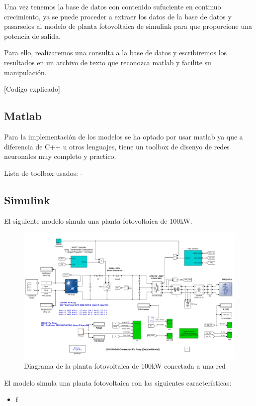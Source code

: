 Una vez tenemos la base de datos con contenido sufuciente en continuo crecimiento, ya se puede proceder a extraer los datos de la base de datos y pasarselos al modelo de planta fotovoltaica de simulink para que proporcione una potencia de salida.

Para ello, realizaremos una consulta a la base de datos y escribiremos los resultados en un archivo de texto que reconozca matlab y facilite su manipulación.

[Codigo explicado]


\subsection{Matlab}
\label{sub:Matlab} 

Para la implementación de los modelos se ha optado por usar matlab ya que a diferencia de C++ u otros lenguajes, tiene un toolbox de disenyo de redes neuronales muy completo y practico.

Lista de toolbox usados:
- 




\subsection{Simulink} 
\label{sub:Simulink}

El siguiente modelo simula una planta fotovoltaica de 100kW. 

\begin{figure}[h]
    \includegraphics[width=\textwidth]{Ppv_diagram.png}
    \caption{Diagrama de la planta fotovoltaica de 100kW conectada a una red}
    \label{fig:Ppv_diagram}
\end{figure}


El modelo simula una planta fotovoltaica con las siguientes características:
\begin{itemize}
    \item f
\end{itemize}

